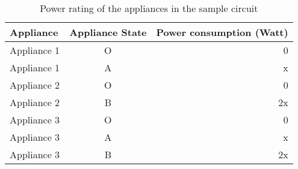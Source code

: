 \begin{table}[htb]
	\centering
	\caption{Power rating of the appliances in the sample circuit}
	\begin{tabular}{@{}lcr@{}}
		Appliance &  Appliance State & Power consumption (Watt) \\
	\midrule
		Appliance 1  &  O  &  0 \\
		Appliance 1  &  A  &  x \\
		Appliance 2  &  O  &  0 \\
		Appliance 2  &  B  &  2x \\
		Appliance 3  &  O  &  0 \\
		Appliance 3  &  A  &  x \\
		Appliance 3  &  B  &  2x \\
	\bottomrule
	\end{tabular}
	\label{tab:powerRatings}
\end{table}
